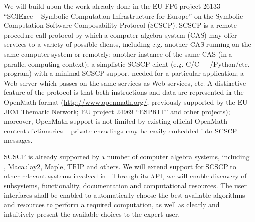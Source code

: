 \begin{workpackage}[id=component-architecture,wphases=3-24!.5,
  title=Component Architecture,lead=UV,
  PSRM=24,UVRM=1,SARM=1, USHRM=4]
\begin{tasklist}
\begin{task}[title=Interfaces between systems,id=interface-systems]
    We will build upon the work already done in the EU FP6 project
    26133 ``SCIEnce -- Symbolic Computation Infrastructure for
    Europe''  on the Symbolic Computation
    Software Composability Protocol (SCSCP). SCSCP is a remote
    procedure call protocol by which a computer algebra system (CAS)
    may offer services to a variety of possible clients, including
    e.g.  another CAS running on the same computer system or remotely;
    another instance of the same CAS (in a parallel computing
    context); a simplistic SCSCP client
    (e.g. C/C++/Python/etc. program) with a minimal SCSCP support
    needed for a particular application; a Web server which passes on
    the same services as Web services, etc.  A distinctive feature of
    the protocol is that both instructions and data are represented in
    the OpenMath format (\url{http://www.openmath.org/}; previously
    supported by the EU JEM Thematic Network; EU project 24969
    ``ESPRIT'' and other projects); moreover, OpenMath support is not
    limited by existing official OpenMath content dictionaries --
    private encodings may be easily embedded into SCSCP messages.
    
    SCSCP is already supported by a number of computer algebra
    systems, including \GAP, Macaulay2, Maple, TRIP and others. We will
    extend support for SCSCP to other relevant systems involved in
    \TheProject.  Through its API, we will enable discovery of
    subsystems, functionality, documentation and computational
    resources. The user interfaces shall be enabled to automatically
    choose the best available algorithms and resources to perform a
    required computation, as well as clearly and intuitively present
    the available choices to the expert user.


\end{task}
\end{tasklist}
\end{workpackage}
